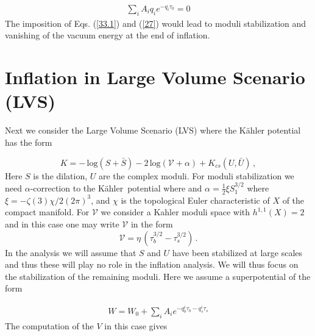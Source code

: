 \documentclass[12pt]{article}
\newcommand{\bl}[1]{{\color{blue}{#1}}}
\def\K{K\"ahler~}
\begin{document}
\begin{align}
  \sum_i A_i q_i e^{-q_i \tau_0}=0
  \label{27}
\end{align}
The imposition of Eqs. (\ref{33.1}) and (\ref{27}) would lead to moduli stabilization and
vanishing of the vacuum energy at the end of  inflation. \\

\bl{Max: Simulation part needs to be added here.}

\section{Inflation in Large Volume Scenario (LVS) \label{sec6}}

Next we consider the Large Volume Scenario (LVS) \cite{Balasubramanian:2005zx}
where  the K\"ahler potential has the form

\begin{equation}
  K =  - \, \text{log} (S+ \bar{S}) -2 \, \text{log} (\mathcal{V}  +\alpha)
  + K_{cs} (U, \bar{U})  \, ,
\end{equation}
Here $S$ is the dilation, $U$ are the complex moduli.  For moduli stabilization  we need  $\alpha$-correction to the \K potential where
and  $\alpha = \frac{1}{2} \xi S_1^{3/2}$ where  $\xi = -\zeta (3) \chi/2 (2\pi)^3$, and $\chi$ is the topological Euler characteristic  of $X$ of the compact manifold. For $\mathcal{V}$ we consider  a Kahler moduli space
with $h^{1,1}(X)=2$ and in this case one may write  $\mathcal{V}$ in the form
\begin{equation}
  \mathcal{V}  = \eta \,( \tau_b^{3/2} - \tau_s^{3/2}) \, .
\end{equation}
In the analysis we will  assume that  $S$ and $U$ have been stabilized at large scales and thus these will play no role in the
inflation analysis.  We will thus focus on the stabilization of the remaining moduli.  Here we assume a superpotential of the form

\begin{align}
  W= W_0 +\sum_i A_i e^{-q^i_b \tau_b -q^i_s \tau_s}
\end{align}
The computation of the $V$ in this case gives
\end{document}
